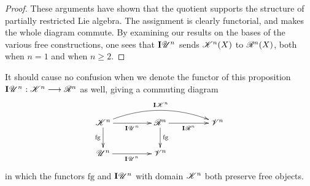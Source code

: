 \documentclass[11pt]{article}
\newcommand{\PRLie}[1]{\scrR^{#1}}%
\newcommand{\LL}[1]{{\scrK}^{#1}}%
\newcommand{\GR}[1]{\scrV^{#1}}%
\newcommand{\nontop}[1]{\scrU^{#1}}%
\newcommand{\restn}[1]{\xi{#1}}
\newcommand{\Ind}[2][]{\mathbf{I}{#2}_{#1}}%
\newcommand{\forget}{\mathrm{fg}}
\newcommand{\Fr}[1]{#1}%
\newcommand{\LambdaOp}{Q}
\begin{document}
\begin{DiagramOfFunctors}
\begin{proof}
These arguments have shown that the quotient supports the structure of partially restricted Lie algebra. The assignment is clearly functorial, and makes the whole diagram commute. 
By examining our results on the bases of the various free constructions, one sees that $\Ind{\nontop{n}}$ sends $\Fr{\LL{n}}(X)$ to $\Fr{\PRLie{n}}(X)$, both when $n=1$ and when $n\geq2$.
\end{proof}
\noindent It should cause no confusion when we denote the functor of this proposition $\Ind{\nontop{n}}:\LL{n}\to \PRLie{n}$ as well, giving a commuting diagram
\[\xymatrix@R=8mm@C=15mm@!C{
\LL{n}
\ar@/^1.5em/[rr]^-{\Ind{\LL{n}}}
\ar[d]_-{\forget}
\ar@{->}[r]_-{\Ind{\nontop{n}}}
&%
\PRLie{n}
\ar[d]^-{\forget}
\ar[r]_-{\Ind{\PRLie{n}}}
&%
\GR{n}
\\%
\nontop{n}
\ar[r]_-{\Ind{\nontop{n}}}
&%
\GR{n}
&%
}\]
in which the functors $\forget$ and $\Ind{\nontop{n}}$ with domain $\LL{n}$ both preserve free objects.
%
%
\end{DiagramOfFunctors}
\end{document}
